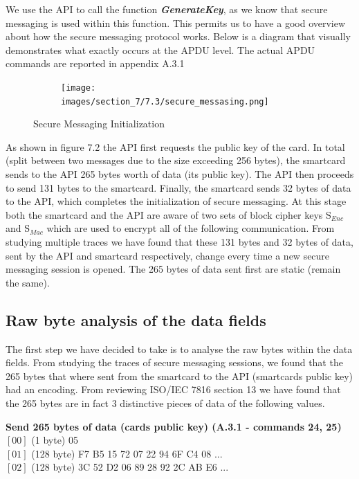 \documentclass[bsc,frontabs,twoside,singlespacing,parskip,deptreport]{infthesis}     %
\begin{document}
We use the API to call the function \textbf{\textit{GenerateKey}}, as we know that secure messaging is used within this function. This permits us to have a good overview about how the secure messaging protocol works. Below is a diagram that visually demonstrates what exactly occurs at the APDU level. The actual APDU commands are reported in appendix A.3.1

\begin{figure}[H]
\centering
\begin{subfigure}{1\textwidth}
  \texttt{[image: images/section\_7/7.3/secure\_messasing.png]}
\end{subfigure}
\caption{Secure Messaging Initialization}
\end{figure}

As shown in figure 7.2 the API first requests the public key of the card. In total (split between two messages due to the size exceeding 256 bytes), the smartcard sends to the API 265 bytes worth of data (its public key). The API then proceeds to send 131 bytes to the smartcard. Finally, the smartcard sends 32 bytes of data to the API, which completes the initialization of secure messaging. At this stage both the smartcard and the API are aware of two sets of block cipher keys S$_{Enc}$ and S$_{Mac}$ which are used to encrypt all of the following communication. From studying multiple traces we have found that these 131 bytes and 32 bytes of data, sent by the API and smartcard respectively, change every time a new secure messaging session is opened. The 265 bytes of data sent first are static (remain the same).

\subsection{Raw byte analysis of the data fields}
The first step we have decided to take is to analyse the raw bytes within the data fields. From studying the traces of secure messaging sessions, we found that the 265 bytes that where sent from the smartcard to the API (smartcards public key) had an encoding. From reviewing ISO/IEC 7816 section 13 we have found that the 265 bytes are in fact 3 distinctive pieces of data of the following values. 

\textbf{Send 265 bytes of data (cards public key) (A.3.1 - commands 24, 25)}\\
$[00]$ (1 byte) 05\\
$[01]$ (128 byte) F7 B5  15 72 07 22 94 6F C4 08 ...\\
$[02]$ (128 byte) 3C 52 D2 06 89 28 92 2C AB E6 ...\\
\end{document}
